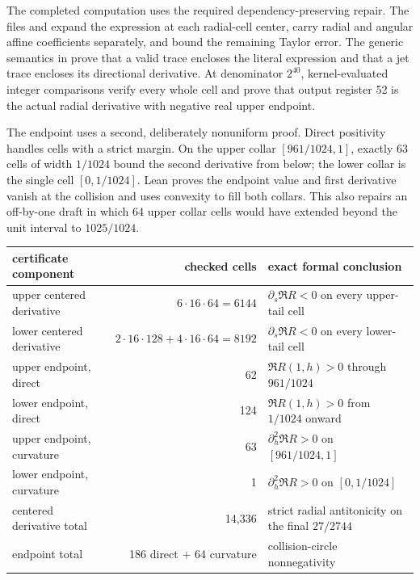 \documentclass[11pt]{article}
\begin{document}
The completed computation uses the required dependency-preserving repair.  The files
 and
 expand the expression at each radial-cell
center, carry radial and angular affine coefficients separately, and bound the remaining Taylor
error.  The generic semantics in  prove that a valid
trace encloses the literal expression and that a jet trace encloses its directional derivative.
At denominator $2^{40}$, kernel-evaluated integer comparisons verify every whole cell and prove
that output register 52 is the actual radial derivative with negative real upper endpoint.

The endpoint uses a second, deliberately nonuniform proof.  Direct positivity handles cells with
a strict margin.  On the upper collar $[961/1024,1]$, exactly 63 cells of width $1/1024$ bound
the second derivative from below; the lower collar is the single cell $[0,1/1024]$.  Lean proves
the endpoint value and first derivative vanish at the collision and uses convexity to fill both
collars.  This also repairs an off-by-one draft in which 64 upper collar cells would have extended
beyond the unit interval to $1025/1024$.

\begin{center}
\begin{tabular}{L{0.30\textwidth}rL{0.42\textwidth}}
\toprule
certificate component & checked cells & exact formal conclusion\\
\midrule
upper centered derivative & $6\cdot16\cdot64=6144$ & $\partial_s\Re R<0$ on every upper-tail cell\\
lower centered derivative & $2\cdot16\cdot128+4\cdot16\cdot64=8192$ & $\partial_s\Re R<0$ on every lower-tail cell\\
upper endpoint, direct & 62 & $\Re R(1,h)>0$ through $961/1024$\\
lower endpoint, direct & 124 & $\Re R(1,h)>0$ from $1/1024$ onward\\
upper endpoint, curvature & 63 & $\partial_h^2\Re R>0$ on $[961/1024,1]$\\
lower endpoint, curvature & 1 & $\partial_h^2\Re R>0$ on $[0,1/1024]$\\
\midrule
centered derivative total & 14,336 & strict radial antitonicity on the final $27/2744$\\
endpoint total & 186 direct $+$ 64 curvature & collision-circle nonnegativity\\
\bottomrule
\end{tabular}
\end{center}
\end{document}
